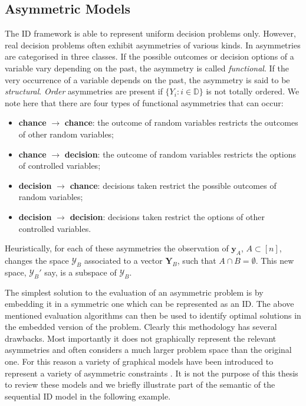 \subsection{Asymmetric Models}
 \label{sec:asy}
The ID framework is able to represent uniform decision problems only. However, real decision problems often exhibit asymmetries of various kinds. In \citet{Jensen2009} asymmetries are categorised in three classes. If the possible outcomes or decision options of a variable vary depending on the past, the asymmetry is called \textit{functional}. If the very occurrence of a variable depends on the past, the asymmetry is said to be \textit{structural}. \textit{Order} asymmetries are present if $\{Y_i:i\in\mathbb{D}\}$ is not totally ordered. We note here that there are four types of functional asymmetries that can occur:
\begin{itemize}
\item \textbf{chance} $\rightarrow$ \textbf{chance}: the outcome of random variables restricts the outcomes of other random variables;
\item \textbf{chance} $\rightarrow$ \textbf{decision}: the outcome of random variables restricts the options of controlled variables;
\item \textbf{decision} $\rightarrow$ \textbf{chance}: decisions taken restrict the possible outcomes of random variables;
\item \textbf{decision} $\rightarrow$ \textbf{decision}:  decisions taken restrict the options of other controlled variables.
\end{itemize}
Heuristically, for each of these asymmetries the observation of $\bm{y}_A$, $A\subset [n]$, changes the space $\bm{\mathcal{Y}}_B$ associated to a vector $\bm{Y}_B$, such that $A\cap B=\emptyset$. This new space, $\bm{\mathcal{Y}}_B'$ say, is a subspace of $\bm{\mathcal{Y}}_B$.

The simplest solution to the evaluation of an asymmetric problem is by embedding it in a symmetric one which can be represented as an ID. The above mentioned evaluation algorithms can then be used to identify optimal solutions in the embedded version of the problem. Clearly this methodology has several drawbacks. Most importantly it does not graphically represent the relevant asymmetries and often considers a much larger problem space than the original one. For this reason a variety of graphical models have been introduced to represent a variety of asymmetric constraints \citep{Smith1993,  Demirer2006a, Nielsen2003, Jensen2006, Jensen2002, Bhattacharjya2012}. It is not the purpose of this thesis to review these models and we briefly illustrate part of the semantic of the sequential ID \citep{Jensen2006} model in the following example. 

